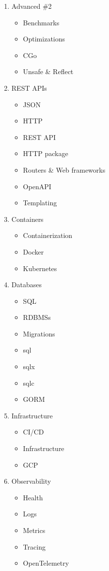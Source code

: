 \documentclass[
  digital,
  color,
  oneside,
  nosansbold,
  nocolorbold,
  lof,
  lot,
]{fithesis4}
\begin{document}
\begin{enumerate}
    \item Advanced \#2
    \begin{itemize}
        \item Benchmarks
        \item Optimizations
        \item CGo
        \item Unsafe \& Reflect
    \end{itemize}
    \item REST APIs
    \begin{itemize}
        \item JSON
        \item HTTP
        \item REST API
        \item HTTP package
        \item Routers \& Web frameworks
        \item OpenAPI
        \item Templating
    \end{itemize}
    \item Containers
    \begin{itemize}
        \item Containerization
        \item Docker
        \item Kubernetes
    \end{itemize}
    \item Databases
    \begin{itemize}
        \item SQL
        \item RDBMSs
        \item Migrations
        \item sql
        \item sqlx
        \item sqlc
        \item GORM
    \end{itemize}
    \item Infrastructure
    \begin{itemize}
        \item CI/CD
        \item Infrastructure
        \item GCP
    \end{itemize}
    \item Observability
    \begin{itemize}
        \item Health
        \item Logs
        \item Metrics
        \item Tracing
        \item OpenTelemetry
    \end{itemize}
\end{enumerate}
\end{document}
